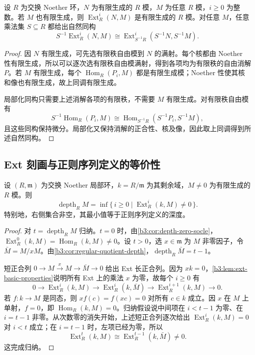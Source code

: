 \begin{proposition}\label{b3:prop:finite-ext-localization}
	设 \(R\) 为交换 Noether 环，\(N\) 为有限生成的 \(R\) 模，\(M\) 为任意 \(R\) 模，\(i\ge0\) 为整数。若 \(M\) 也有限生成，则 \(\operatorname{Ext}_R^i(N,M)\) 是有限生成的 \(R\) 模。对任意 \(M\)，任意乘法集 \(S\subseteq R\) 都给出自然同构
	\[
		S^{-1}\operatorname{Ext}_R^i(N,M) \cong\operatorname{Ext}_{S^{-1}R}^i(S^{-1}N,S^{-1}M).
	\]
\end{proposition}
\begin{proof}
	因 \(N\) 有限生成，可先选有限秩自由模到 \(N\) 的满射。每个核都由 Noether 性有限生成，所以可以逐次选有限秩自由模满射，得到各项均为有限秩的自由消解 \(P\)。若 \(M\) 有限生成，每个 \(\operatorname{Hom}_R(P_i,M)\) 都是有限生成模；Noether 性使其核和像也有限生成，故上同调有限生成。

	局部化同构只需要上述消解各项的有限秩，不需要 \(M\) 有限生成。对有限秩自由模有
	\[
		S^{-1}\operatorname{Hom}_R(P_i,M) \cong\operatorname{Hom}_{S^{-1}R}(S^{-1}P_i,S^{-1}M),
	\]
	且这些同构保持微分。局部化又保持消解的正合性、核及像，因此取上同调得到所述自然同构。
\end{proof}

\subsection{Ext 刻画与正则序列定义的等价性}
\label{b3:subsec:1602:02}

\begin{theorem}\label{b3:thm:depth-ext}
	设 \((R,\mathfrak m)\) 为交换 Noether 局部环，\(k=R/\mathfrak m\) 为其剩余域，\(M\ne0\) 为有限生成的 \(R\) 模。则
	\[
		\operatorname{depth}_RM =\inf\{\,i\ge0\mid\operatorname{Ext}_R^i(k,M)\ne0\,\}.
	\]
	特别地，右侧集合非空，其最小值等于正则序列定义的深度。
\end{theorem}
\begin{proof}
	对 \(t=\operatorname{depth}_RM\) 归纳。\(t=0\) 时，由\cref{b3:cor:depth-zero-socle}，\(\operatorname{Ext}_R^0(k,M)=\operatorname{Hom}_R(k,M)\ne0\)。设 \(t>0\)，选 \(x\in\mathfrak m\) 为 \(M\) 非零因子，令 \(\bar M=M/xM\)。由\cref{b3:cor:regular-quotient-depth}，\(\operatorname{depth}_R\bar M=t-1\)。

	短正合列 \(0\rightarrow M\xrightarrow{x}M\rightarrow\bar M\rightarrow0\) 给出 Ext 长正合列。因为 \(xk=0\)，\cref{b3:lem:ext-basic-properties}说明所有 Ext 上的乘法 \(x\) 为零，故每个 \(i\ge0\) 有
	\[
		0\longrightarrow\operatorname{Ext}_R^i(k,M) \longrightarrow\operatorname{Ext}_R^i(k,\bar M) \longrightarrow\operatorname{Ext}_R^{i+1}(k,M)\longrightarrow0.
	\]
	若 \(f:k\to M\) 是同态，则 \(xf(c)=f(xc)=0\) 对所有 \(c\in k\) 成立。因 \(x\) 在 \(M\) 上单射，\(f=0\)，即 \(\operatorname{Hom}_R(k,M)=0\)。归纳假设说中间项在 \(i<t-1\) 为零、在 \(i=t-1\) 非零。从次数零的消失开始，上述短正合列逐次给出 \(\operatorname{Ext}_R^i(k,M)=0\) 对 \(i<t\) 成立；在 \(i=t-1\) 时，左项已经为零，所以
	\[
		\operatorname{Ext}_R^t(k,M)\cong\operatorname{Ext}_R^{t-1}(k,\bar M)\ne0.
	\]
	这完成归纳。
\end{proof}

